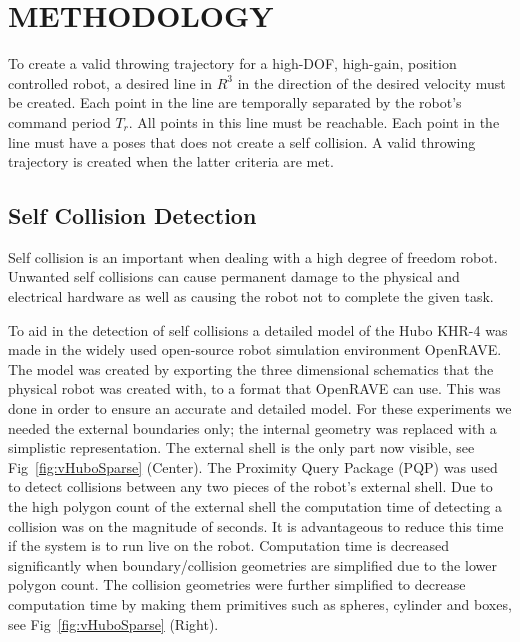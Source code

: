 \section{METHODOLOGY}\label{sec:methodology}
To create a valid throwing trajectory for a high-DOF, high-gain, position controlled robot, a desired line in $R^3$ in the direction of the desired velocity must be created.  Each point in the line are temporally separated by the robot's command period $T_r$.  All points in this line must be reachable.  Each point in the line must have a poses that does not create a self collision.  A valid throwing trajectory is created when the latter criteria are met.

\subsection{Self Collision Detection}\label{sec:selfCollision}
Self collision is an important when dealing with a high degree of freedom robot.  Unwanted self collisions can cause permanent damage to the physical and electrical hardware as well as causing the robot not to complete the given task.

To aid in the detection of self collisions a detailed model of the Hubo KHR-4 was made in the widely used open-source robot simulation environment OpenRAVE\cite{diankovThesis}.  The model was created by exporting the three dimensional schematics that the physical robot was created with, to a format that OpenRAVE can use.  This was done in order to ensure an accurate and detailed model.  For these experiments we needed the external boundaries only; the internal geometry was replaced with a simplistic representation.  The external shell is the only part now visible, see Fig~\ref{fig:vHuboSparse} (Center).  The Proximity Query Package (PQP) was used to detect collisions between any two pieces of the robot's external shell.  Due to the high polygon count of the external shell the computation time of detecting a collision was on the magnitude of seconds.  It is advantageous to reduce this time if the system is to run live on the robot.  Computation time is decreased significantly when boundary/collision geometries are simplified due to the lower polygon count.  The collision geometries were further simplified to decrease computation time by making them primitives such as spheres, cylinder and boxes, see Fig~\ref{fig:vHuboSparse} (Right). 


